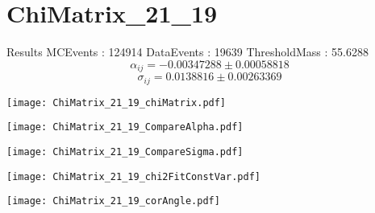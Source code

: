 \documentclass[a4paper,12pt]{article}
\begin{document}
\section{ChiMatrix\_21\_19}
\begin{minipage}{0.49\linewidth} Results \newline
MCEvents : 124914\newline
DataEvents : 19639 \newline
ThresholdMass : 55.6288\\
$$\alpha_{ij} = -0.00347288\pm 0.00058818$$
$$\sigma_{ij} = 0.0138816\pm 0.00263369$$
\end{minipage}\hfill
\begin{minipage}{0.49\linewidth} 
\texttt{[image: ChiMatrix\_21\_19\_chiMatrix.pdf]}\\
\end{minipage}
\hfill
\begin{minipage}{0.49\linewidth} 
\texttt{[image: ChiMatrix\_21\_19\_CompareAlpha.pdf]}\\
\end{minipage}
\hfill
\begin{minipage}{0.49\linewidth} 
\texttt{[image: ChiMatrix\_21\_19\_CompareSigma.pdf]}\\
\end{minipage}
\begin{minipage}{0.49\linewidth} 
\texttt{[image: ChiMatrix\_21\_19\_chi2FitConstVar.pdf]}\\
\end{minipage}
\hfill
\begin{minipage}{0.49\linewidth} 
\texttt{[image: ChiMatrix\_21\_19\_corAngle.pdf]}\\
\end{minipage}
\end{document}
